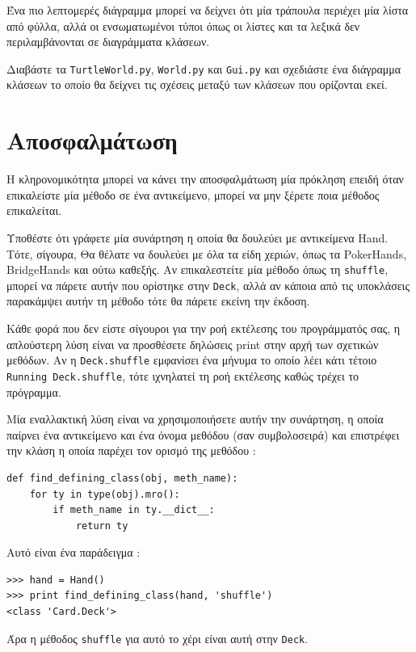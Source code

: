 \documentclass[10pt]{book}
\begin{document}
Ένα πιο λεπτομερές διάγραμμα μπορεί να δείχνει ότι μία τράπουλα περιέχει μία λίστα 
από φύλλα, αλλά οι ενσωματωμένοι τύποι όπως οι λίστες και τα λεξικά δεν περιλαμβάνονται 
σε διαγράμματα κλάσεων.


\begin{exercise}

Διαβάστε τα  {\tt TurtleWorld.py}, {\tt World.py}  και  {\tt Gui.py}  και 
σχεδιάστε ένα διάγραμμα κλάσεων το οποίο θα δείχνει τις σχέσεις μεταξύ των κλάσεων που 
ορίζονται εκεί.

\end{exercise}


\section{Αποσφαλμάτωση}

Η κληρονομικότητα μπορεί να κάνει την αποσφαλμάτωση μία πρόκληση επειδή όταν 
επικαλείστε μία μέθοδο σε ένα αντικείμενο, μπορεί να μην ξέρετε ποια μέθοδος 
επικαλείται.

Υποθέστε ότι γράφετε μία συνάρτηση η οποία θα δουλεύει με αντικείμενα  Hand.  
 Τότε, σίγουρα, Θα θέλατε να δουλεύει με όλα τα είδη χεριών, όπως τα  PokerHands, BridgeHands  και ούτω καθεξής.  Αν επικαλεστείτε μία μέθοδο όπως τη  {\tt shuffle}, 
 μπορεί να πάρετε αυτήν που ορίστηκε στην  {\tt Deck},  αλλά αν κάποια από 
τις υποκλάσεις παρακάμψει αυτήν τη μέθοδο τότε θα πάρετε εκείνη την έκδοση.

Κάθε φορά που δεν είστε σίγουροι για την ροή εκτέλεσης του προγράμματός σας, η 
απλούστερη λύση είναι να προσθέσετε δηλώσεις  print  στην αρχή των σχετικών 
μεθόδων.  Αν η  {\tt Deck.shuffle}  εμφανίσει ένα μήνυμα το οποίο λέει κάτι 
τέτοιο  {\tt Running Deck.shuffle},  τότε ιχνηλατεί τη ροή εκτέλεσης καθώς 
τρέχει το πρόγραμμα.

Μία εναλλακτική λύση είναι να χρησιμοποιήσετε αυτήν την συνάρτηση, η οποία παίρνει 
ένα αντικείμενο και ένα όνομα μεθόδου (σαν συμβολοσειρά) και επιστρέφει την κλάση η 
οποία παρέχει τον ορισμό της μεθόδου :

\begin{verbatim}
def find_defining_class(obj, meth_name):
    for ty in type(obj).mro():
        if meth_name in ty.__dict__:
            return ty
\end{verbatim}
%
 Αυτό είναι ένα παράδειγμα :

\begin{verbatim}
>>> hand = Hand()
>>> print find_defining_class(hand, 'shuffle')
<class 'Card.Deck'>
\end{verbatim}
%
 Άρα η μέθοδος  {\tt shuffle}  για αυτό το χέρι είναι αυτή στην  {\tt Deck}.
\end{document}
